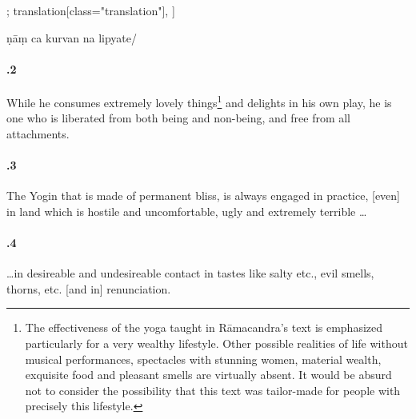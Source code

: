 \begin{alignment}[
  texts=edition[class="edition"];
  translation[class="translation"],
  ]
\begin{edition}
\begin{tlg}[58_6]
{ṇāṃ ca
kurvan na lipyate/}\\
\end{tlg}
  \end{edition}
  \begin{translation}
    \begin{tlate}[58_2]
\paragraph{.2} While he consumes extremely lovely things\footnote{The effectiveness of the yoga taught in Rāmacandra's text is emphasized particularly for a very wealthy lifestyle. Other possible realities of life without musical performances, spectacles with stunning women, material wealth, exquisite food and pleasant smells are virtually absent. It would be absurd not to consider the possibility that this text was tailor-made for people with precisely this lifestyle.} and delights in his own play, he is one who is liberated from both being and non-being, and free from all attachments.
\end{tlate}
\begin{tlate}[58_3]
\paragraph{.3} The Yogin that is made of permanent bliss, is always engaged in practice, [even] in land which is hostile and uncomfortable, ugly and extremely terrible \ldots
\end{tlate}
\begin{tlate}[58_4]
\paragraph{.4} \ldots in desireable and undesireable contact in tastes like salty etc., evil smells, thorns, etc. [and in] renunciation.
\end{tlate}
\begin{tlate}[58_5]

\end{tlate}
\end{translation}
\end{alignment}
